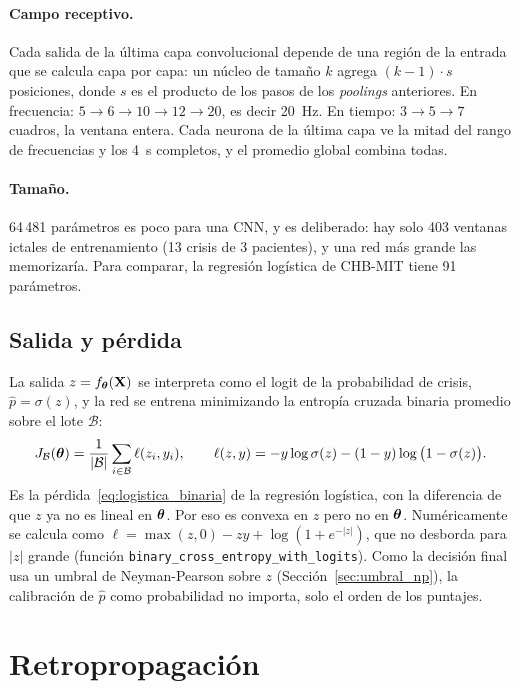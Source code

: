 \paragraph{Campo receptivo.} Cada salida de la última capa convolucional depende de una región de la entrada que se calcula
capa por capa: un núcleo de tamaño $k$ agrega $(k-1)\cdot s$ posiciones, donde $s$ es el producto de los pasos de los
\emph{poolings} anteriores. En frecuencia: $5 \to 6 \to 10 \to 12 \to 20$, es decir 20~Hz. En tiempo: $3 \to 5 \to 7$
cuadros, la ventana entera. Cada neurona de la última capa ve la mitad del rango de frecuencias y los 4~s completos, y el
promedio global combina todas.

\paragraph{Tamaño.} 64\,481 parámetros es poco para una CNN, y es deliberado: hay solo 403 ventanas ictales de
entrenamiento (13 crisis de 3 pacientes), y una red más grande las memorizaría. Para comparar, la regresión logística de
CHB-MIT tiene 91 parámetros.

\subsection{Salida y pérdida}

La salida $z = f_{\boldsymbol{\theta}}(\mathbf{X})$ se interpreta como el logit de la probabilidad de crisis, $\hat p = \sigma(z)$, y la red
se entrena minimizando la entropía cruzada binaria promedio sobre el lote $\mathcal{B}$:
\begin{equation}
  J_{\mathcal{B}}(\boldsymbol{\theta}) = \frac{1}{|\mathcal{B}|}\sum_{i \in \mathcal{B}} \ell(z_i, y_i), \qquad
  \ell(z, y) = -y\log\sigma(z) - (1 - y)\log\big(1 - \sigma(z)\big).
  \label{eq:bce}
\end{equation}
Es la pérdida~\eqref{eq:logistica_binaria} de la regresión logística, con la diferencia de que $z$ ya no es lineal en $\boldsymbol{\theta}$.
Por eso es convexa en $z$ pero no en $\boldsymbol{\theta}$. Numéricamente se calcula como
$\ell = \max(z, 0) - zy + \log(1 + e^{-|z|})$, que no desborda para $|z|$ grande (función
\texttt{binary\_cross\_entropy\_with\_logits}). Como la decisión final usa un umbral de Neyman-Pearson sobre $z$
(Sección~\ref{sec:umbral_np}), la calibración de $\hat p$ como probabilidad no importa, solo el orden de los puntajes.

\section{Retropropagación}
\label{sec:retropropagacion}

